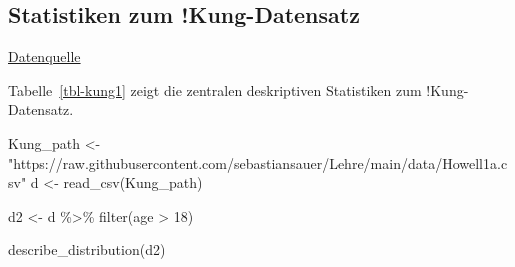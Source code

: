 \documentclass[
  a4paper,
  DIV=11]{scrreprt}
\newenvironment{Shaded}{\begin{snugshade}}{\end{snugshade}}
\newcommand{\DecValTok}[1]{\textcolor[rgb]{0.68,0.00,0.00}{#1}}
\newcommand{\FunctionTok}[1]{\textcolor[rgb]{0.28,0.35,0.67}{#1}}
\newcommand{\NormalTok}[1]{\textcolor[rgb]{0.00,0.23,0.31}{#1}}
\newcommand{\OtherTok}[1]{\textcolor[rgb]{0.00,0.23,0.31}{#1}}
\newcommand{\SpecialCharTok}[1]{\textcolor[rgb]{0.37,0.37,0.37}{#1}}
\newcommand{\StringTok}[1]{\textcolor[rgb]{0.13,0.47,0.30}{#1}}
\theoremstyle{definition}
\theoremstyle{remark}
\begin{document}
\hypertarget{statistiken-zum-kung-datensatz}{%
\subsection{Statistiken zum
!Kung-Datensatz}\label{statistiken-zum-kung-datensatz}}

\href{https://raw.githubusercontent.com/sebastiansauer/Lehre/main/data/Howell1a.csv}{Datenquelle}

Tabelle~\ref{tbl-kung1} zeigt die zentralen deskriptiven Statistiken zum
!Kung-Datensatz.

\begin{Shaded}
\begin{Highlighting}[]
\NormalTok{Kung\_path }\OtherTok{\textless{}{-}} \StringTok{"https://raw.githubusercontent.com/sebastiansauer/Lehre/main/data/Howell1a.csv"}  
\NormalTok{d }\OtherTok{\textless{}{-}} \FunctionTok{read\_csv}\NormalTok{(Kung\_path)  }

\NormalTok{d2 }\OtherTok{\textless{}{-}}\NormalTok{ d }\SpecialCharTok{\%\textgreater{}\%} \FunctionTok{filter}\NormalTok{(age }\SpecialCharTok{\textgreater{}} \DecValTok{18}\NormalTok{)}

\FunctionTok{describe\_distribution}\NormalTok{(d2)}
\end{Highlighting}
\end{Shaded}
\end{document}
